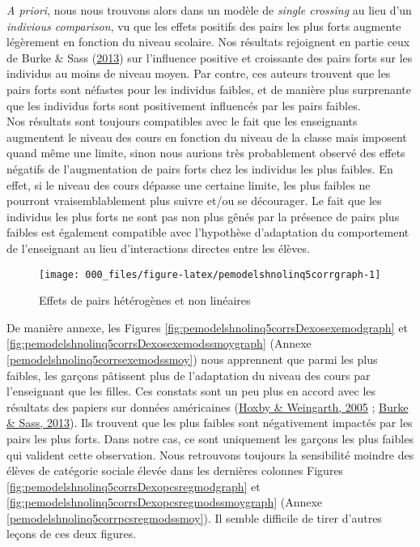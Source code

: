 \documentclass[
]{book}
\begin{document}
\quad \textit{A priori}, nous nous trouvons alors dans un modèle de \emph{single crossing} au lieu d'un \emph{indivious comparison}, vu que les effets positifs des pairs les plus forts augmente légèrement en fonction du niveau scolaire. Nos résultats rejoignent en partie ceux de Burke \& Sass (\protect\hyperlink{ref-BUR:SAS:13}{2013}) sur l'influence positive et croissante des pairs forts sur les individus au moins de niveau moyen. Par contre, ces auteurs trouvent que les pairs forts sont néfastes pour les individus faibles, et de manière plus surprenante que les individus forts sont positivement influencés par les pairs faibles.\\
Nos résultats sont toujours compatibles avec le fait que les enseignants augmentent le niveau des cours en fonction du niveau de la classe mais imposent quand même une limite, sinon nous aurions très probablement observé des effets négatifs de l'augmentation de pairs forts chez les individus les plus faibles. En effet, si le niveau des cours dépasse une certaine limite, les plus faibles ne pourront vraisemblablement plus suivre et/ou se décourager. Le fait que les individus les plus forts ne sont pas non plus gênés par la présence de pairs plus faibles est également compatible avec l'hypothèse d'adaptation du comportement de l'enseignant au lieu d'interactions directes entre les élèves.

\begin{figure}[H]

{\centering \texttt{[image: 000\_files/figure-latex/pemodelshnolinq5corrgraph-1]} 

}

\caption{Effets de pairs hétérogènes et non linéaires}\label{fig:pemodelshnolinq5corrgraph}
\end{figure}

De manière annexe, les Figures \ref{fig:pemodelshnolinq5corrsDexosexemodgraph} et \ref{fig:pemodelshnolinq5corrsDexosexemodssmoygraph} (Annexe \ref{pemodelshnolinq5corrsexemodssmoy}) nous apprennent que parmi les plus faibles, les garçons pâtissent plus de l'adaptation du niveau des cours par l'enseignant que les filles. Ces constats sont un peu plus en accord avec les résultats des papiers sur données américaines (\protect\hyperlink{ref-HOX:WEI:05}{Hoxby \& Weingarth, 2005} ; \protect\hyperlink{ref-BUR:SAS:13}{Burke \& Sass, 2013}). Ils trouvent que les plus faibles sont négativement impactés par les pairs les plus forts. Dans notre cas, ce sont uniquement les garçons les plus faibles qui valident cette observation.
Nous retrouvons toujours la sensibilité moindre des élèves de catégorie sociale élevée dans les dernières colonnes Figures \ref{fig:pemodelshnolinq5corrsDexopcsregmodgraph} et \ref{fig:pemodelshnolinq5corrsDexopcsregmodssmoygraph} (Annexe \ref{pemodelshnolinq5corrpcsregmodssmoy}). Il semble difficile de tirer d'autres leçons de ces deux figures.
\end{document}
